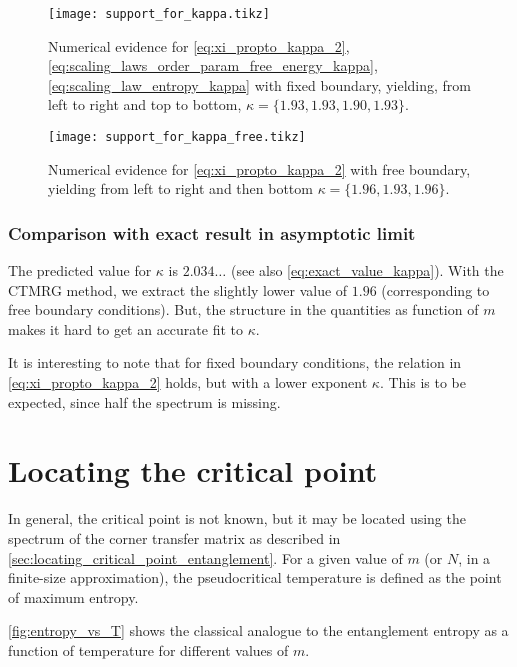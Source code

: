 \begin{figure}
  \texttt{[image: support\_for\_kappa.tikz]}
  \caption{Numerical evidence for \autoref{eq:xi_propto_kappa_2}, \autoref{eq:scaling_laws_order_param_free_energy_kappa},
  \autoref{eq:scaling_law_entropy_kappa} with fixed boundary, yielding, from left to right and top to bottom, $\kappa = \{ 1.93, 1.93, 1.90,
  1.93 \}$.}\label{fig:support_for_kappa}
\end{figure}

\begin{figure}
  \texttt{[image: support\_for\_kappa\_free.tikz]}
  \caption{Numerical evidence for \autoref{eq:xi_propto_kappa_2} with free boundary,
  yielding from left to right and then bottom $\kappa = \{ 1.96,
  1.93, 1.96 \}$.}\label{fig:support_for_kappa_free} \end{figure}

\subsubsection{Comparison with exact result in asymptotic limit}

The predicted value for $\kappa$ \cite{pollmann2009theory} is $2.034\dots$ (see also \autoref{eq:exact_value_kappa}).
With the CTMRG method, we extract the slightly lower value of $1.96$ (corresponding to free boundary conditions).
But, the structure in the quantities as function of $m$ makes it hard to get an accurate fit to $\kappa$.

It is interesting to note that for fixed boundary conditions, the relation in \autoref{eq:xi_propto_kappa_2} holds,
but with a lower exponent $\kappa$. This is to be expected, since half the spectrum is missing.

\section{Locating the critical point}

In general, the critical point is not known, but it may be located using the spectrum of the corner transfer matrix as
described in \autoref{sec:locating_critical_point_entanglement}. For a given value of $m$ (or $N$, in a finite-size approximation), the pseudocritical temperature is defined as the point of maximum entropy.

\autoref{fig:entropy_vs_T} shows the classical analogue to the entanglement entropy as a function of temperature for
different values of $m$.

